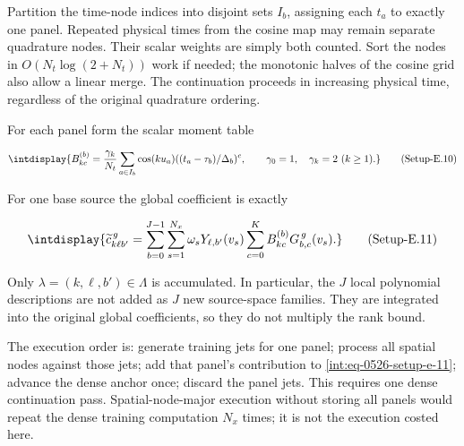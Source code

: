 
Partition the time-node indices into disjoint sets \(I_b\), assigning each \(t_a\) to exactly one panel. Repeated physical times from the cosine map may remain separate quadrature nodes. Their scalar weights are simply both counted. Sort the nodes in \(O(N_t\log(2+N_t))\) work if needed; the monotonic halves of the cosine grid also allow a linear merge. The continuation proceeds in increasing physical time, regardless of the original quadrature ordering.



For each panel form the scalar moment table


\label{int:eq-setup-e-10}
\begingroup\renewcommand{\theHequation}{intdisplay.1011}
\begin{equation}
\intdisplay{
B^{(b)}_{kc}=\frac{\gamma_k}{N_t}\sum_{a\in I_b}
      \cos(ku_a)((t_a-\tau_b)/\Delta_b)^c,
\qquad \gamma_0=1,\quad \gamma_k=2\ (k\ge1).
}
\tag{Setup-E.10}
\label{int:eq-0525-setup-e-10}
\end{equation}
\endgroup


For one base source the global coefficient is exactly


\label{int:eq-setup-e-11}
\begingroup\renewcommand{\theHequation}{intdisplay.1012}
\begin{equation}
\intdisplay{
\widetilde c_{k\ell b'}^{\,g}
 =\sum_{b=0}^{J-1}\sum_{s=1}^{N_x}\omega_sY_{\ell,b'}(v_s)
                    \sum_{c=0}^K B^{(b)}_{kc}G_{b,c}^{\,g}(v_s).
}
\tag{Setup-E.11}
\label{int:eq-0526-setup-e-11}
\end{equation}
\endgroup


Only \(\lambda=(k,\allowbreak \ell,\allowbreak b')\in\Lambda\) is accumulated. In particular, the \(J\) local polynomial descriptions are not added as \(J\) new source-space families. They are integrated into the original global coefficients, so they do not multiply the rank bound.



The execution order is: generate training jets for one panel; process all spatial nodes against those jets; add that panel's contribution to \hyperref[int:eq-setup-e-11]{\eqref{int:eq-0526-setup-e-11}}; advance the dense anchor once; discard the panel jets. This requires one dense continuation pass. Spatial-node-major execution without storing all panels would repeat the dense training computation \(N_x\) times; it is not the execution costed here.


